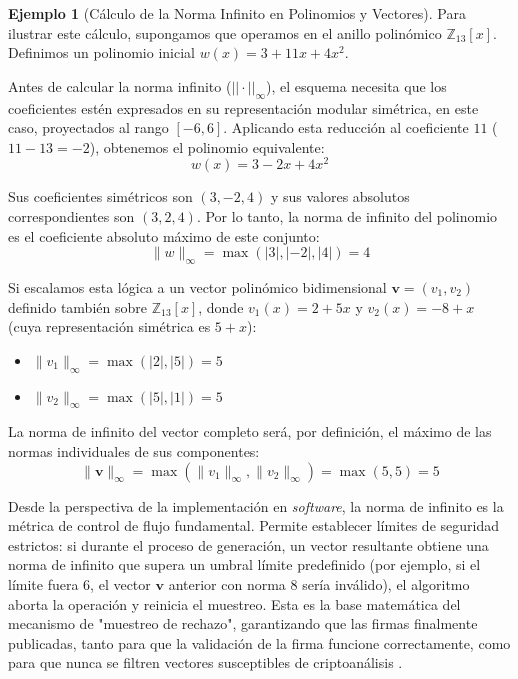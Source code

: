 \documentclass[11pt, a4paper]{report}
\theoremstyle{definition}
\newtheorem{ejemplo}{Ejemplo}[chapter]
\begin{document}
\begin{ejemplo}[Cálculo de la Norma Infinito en Polinomios y Vectores]
\label{ex:norma_infinito}
Para ilustrar este cálculo, supongamos que operamos en el anillo polinómico $\mathbb{Z}_{13}[x]$. Definimos un polinomio inicial $w(x) = 3 + 11x + 4x^2$. 

Antes de calcular la norma infinito ($||\cdot||_\infty$), el esquema necesita que los coeficientes estén expresados en su representación modular simétrica, en este caso, proyectados al rango $[-6, 6]$. Aplicando esta reducción al coeficiente $11$ ($11 - 13 = -2$), obtenemos el polinomio equivalente:
$$w(x) = 3 - 2x + 4x^2$$

Sus coeficientes simétricos son $(3, -2, 4)$ y sus valores absolutos correspondientes son $(3, 2, 4)$. Por lo tanto, la norma de infinito del polinomio es el coeficiente absoluto máximo de este conjunto:
$$ \| w \|_\infty = \max(|3|, |-2|, |4|) = 4 $$

Si escalamos esta lógica a un vector polinómico bidimensional $\mathbf{v} = (v_1, v_2)$ definido también sobre $\mathbb{Z}_{13}[x]$, donde $v_1(x) = 2 + 5x$ y $v_2(x) = -8 + x$ (cuya representación simétrica es $5 + x$):
\begin{itemize}
    \item $\| v_1 \|_\infty = \max(|2|, |5|) = 5$
    \item $\| v_2 \|_\infty = \max(|5|, |1|) = 5$
\end{itemize}

La norma de infinito del vector completo será, por definición, el máximo de las normas individuales de sus componentes: 
$$ \| \mathbf{v} \|_\infty = \max(\| v_1 \|_\infty, \| v_2 \|_\infty) = \max(5, 5) = 5 $$
\end{ejemplo}

Desde la perspectiva de la implementación en \textit{software}, la norma de infinito es la métrica de control de flujo fundamental. Permite establecer límites de seguridad estrictos: si durante el proceso de generación, un vector resultante obtiene una norma de infinito que supera un umbral límite predefinido (por ejemplo, si el límite fuera $6$, el vector $\mathbf{v}$ anterior con norma $8$ sería inválido), el algoritmo aborta la operación y reinicia el muestreo. Esta es la base matemática del mecanismo de "muestreo de rechazo", garantizando que las firmas finalmente publicadas, tanto para que la validación de la firma funcione correctamente, como para que nunca se filtren vectores susceptibles de criptoanálisis \cite{nist_fips204}.
\end{document}
